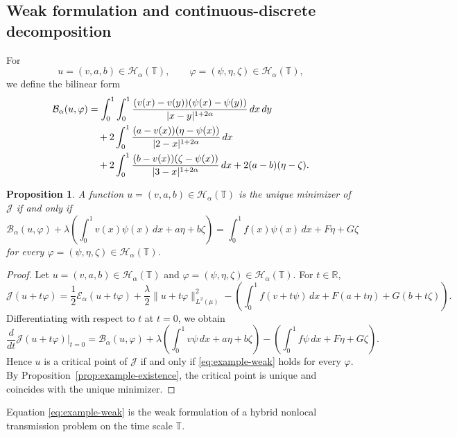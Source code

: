 \documentclass[11pt]{article}
\numberwithin{equation}{section}
\newtheorem{proposition}[theorem]{Proposition}
\theoremstyle{definition}
\begin{document}
\subsection{Weak formulation and continuous-discrete decomposition}

For
\[
u=(v,a,b)\in\mathcal H_\alpha(\mathbb T),
\qquad
\varphi=(\psi,\eta,\zeta)\in\mathcal H_\alpha(\mathbb T),
\]
we define the bilinear form
\begin{align}
\mathcal B_\alpha(u,\varphi)
&=
\int_0^1\int_0^1
\frac{(v(x)-v(y))(\psi(x)-\psi(y))}{|x-y|^{1+2\alpha}}\,dx\,dy
\notag\\
&\quad
+2\int_0^1
\frac{(a-v(x))(\eta-\psi(x))}{|2-x|^{1+2\alpha}}\,dx
\notag\\
&\quad
+2\int_0^1
\frac{(b-v(x))(\zeta-\psi(x))}{|3-x|^{1+2\alpha}}\,dx
+2(a-b)(\eta-\zeta).
\label{eq:example-bilinear}
\end{align}

\begin{proposition}\label{prop:example-weak}
A function $u=(v,a,b)\in\mathcal H_\alpha(\mathbb T)$ is the unique minimizer of $\mathcal J$ if and only if
\begin{equation}\label{eq:example-weak}
\mathcal B_\alpha(u,\varphi)
+\lambda\left(\int_0^1 v(x)\psi(x)\,dx+a\eta+b\zeta\right)
=
\int_0^1 f(x)\psi(x)\,dx+F\eta+G\zeta
\end{equation}
for every $\varphi=(\psi,\eta,\zeta)\in\mathcal H_\alpha(\mathbb T)$.
\end{proposition}

\begin{proof}
Let $u=(v,a,b)\in\mathcal H_\alpha(\mathbb T)$ and $\varphi=(\psi,\eta,\zeta)\in\mathcal H_\alpha(\mathbb T)$. For $t\in\mathbb R$,
\[
\mathcal J(u+t\varphi)
=
\frac12\mathcal E_\alpha(u+t\varphi)
+\frac{\lambda}{2}\|u+t\varphi\|_{L^2(\mu)}^2
-
\left(
\int_0^1 f(v+t\psi)\,dx+F(a+t\eta)+G(b+t\zeta)
\right).
\]
Differentiating with respect to $t$ at $t=0$, we obtain
\[
\frac{d}{dt}\mathcal J(u+t\varphi)\Big|_{t=0}
=
\mathcal B_\alpha(u,\varphi)
+\lambda\left(\int_0^1 v\psi\,dx+a\eta+b\zeta\right)
-\left(\int_0^1 f\psi\,dx+F\eta+G\zeta\right).
\]
Hence $u$ is a critical point of $\mathcal J$ if and only if \eqref{eq:example-weak} holds for every $\varphi$. By Proposition~\ref{prop:example-existence}, the critical point is unique and coincides with the unique minimizer.
\end{proof}

Equation \eqref{eq:example-weak} is the weak formulation of a hybrid nonlocal transmission problem on the time scale $\mathbb T$.
\end{document}
